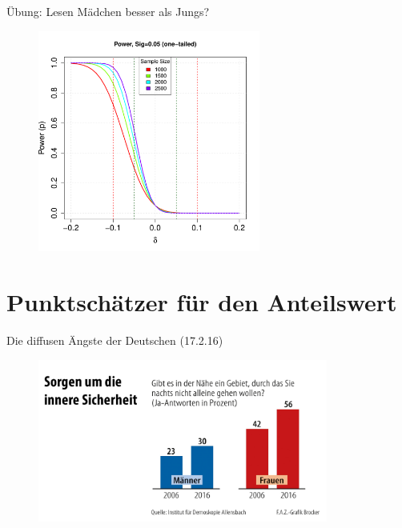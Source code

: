 \documentclass[usenames,dvipsnames,handout]{beamer}
\begin{document}
\begin{frame}{Übung: Lesen Mädchen besser als Jungs? }
  \begin{figure}[ht]
 	\centering
 	      \includegraphics[width=0.65\textwidth]{powerPisa.pdf}%
 	\end{figure}
\end{frame}

\section{Punktschätzer für den Anteilswert}

\begin{frame}{Die diffusen Ängste der Deutschen (17.2.16)}
  \begin{figure}[ht]
 	\centering
 	      \includegraphics[width=0.85\textwidth]{sorgen.jpg}%
 	\end{figure}
\end{frame}
\end{document}
